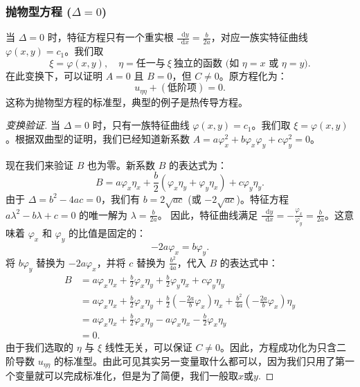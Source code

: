 \documentclass[12pt,a4paper]{article}
\newcommand{\diff}{\mathop{}\!\mathrm{d}}
\numberwithin{subsection}{section}   %
\numberwithin{subsubsection}{subsection}
\theoremstyle{plain}
\theoremstyle{definition}
\theoremstyle{remark}
\theoremstyle{remark}
\begin{document}
	\subsubsection{抛物型方程 (\texorpdfstring{$\Delta = 0$}{Delta = 0})}
	当 \(\Delta = 0\) 时，特征方程只有一个重实根 \(\frac{\diff y}{\diff x} = \frac{b}{2a}\)，对应一族实特征曲线 \(\varphi(x,y)=c_1\)。我们取
	\[
	\xi = \varphi(x,y), \quad \eta = \text{任一与}\ \xi\ \text{独立的函数 (如 } \eta=x \text{ 或 } \eta=y).
	\]
	在此变换下，可以证明 \(A=0\) 且 \(B=0\)，但 \(C \neq 0\)。原方程化为：
	\begin{equation}\label{eq:parabolic_canonical}
		u_{\eta\eta} + (\text{低阶项}) = 0.
	\end{equation}
	这称为抛物型方程的标准型，典型的例子是热传导方程。
	
	\begin{proof}[变换验证]
		当 \(\Delta = 0\) 时，只有一族特征曲线 \(\varphi(x,y)=c_1\)。我们取 \(\xi = \varphi(x,y)\)。根据双曲型的证明，我们已经知道新系数 \(A = a\varphi_x^2 + b\varphi_x\varphi_y + c\varphi_y^2 = 0\)。
		
		现在我们来验证 \(B\) 也为零。新系数 \(B\) 的表达式为：
		\[
		B = a\varphi_x\eta_x + \frac{b}{2}(\varphi_x\eta_y + \varphi_y\eta_x) + c\varphi_y\eta_y.
		\]
		由于 \(\Delta = b^2 - 4ac = 0\)，我们有 \(b = 2\sqrt{ac}\) (或 \(-2\sqrt{ac}\))。特征方程 \(a\lambda^2 - b\lambda + c = 0\) 的唯一解为 \(\lambda = \frac{b}{2a}\)。
		因此，特征曲线满足 \(\frac{\diff y}{\diff x} = -\frac{\varphi_x}{\varphi_y} = \frac{b}{2a}\)。这意味着 \(\varphi_x\) 和 \(\varphi_y\) 的比值是固定的：
		\[
		-2a\varphi_x = b\varphi_y.
		\]
		将 \(b\varphi_y\) 替换为 \(-2a\varphi_x\)，并将 \(c\) 替换为 \(\frac{b^2}{4a}\)，代入 \(B\) 的表达式中：
		\begin{align*}
			B &= a\varphi_x\eta_x + \frac{b}{2}\varphi_x\eta_y + \frac{b}{2}\varphi_y\eta_x + c\varphi_y\eta_y \\
			&= a\varphi_x\eta_x + \frac{b}{2}\varphi_x\eta_y + \frac{b}{2}\left(-\frac{2a}{b}\varphi_x\right)\eta_x + \frac{b^2}{4a}\left(-\frac{2a}{b}\varphi_x\right)\eta_y \\
			&= a\varphi_x\eta_x + \frac{b}{2}\varphi_x\eta_y - a\varphi_x\eta_x - \frac{b}{2}\varphi_x\eta_y \\
			&= 0.
		\end{align*}
		由于我们选取的 \(\eta\) 与 \(\xi\) 线性无关，可以保证 \(C \neq 0\)。因此，方程成功化为只含二阶导数 \(u_{\eta\eta}\) 的标准型。由此可见其实另一变量取什么都可以，因为我们只用了第一个变量就可以完成标准化，但是为了简便，我们一般取$x$或$y$.
	\end{proof}
	
\end{document}
